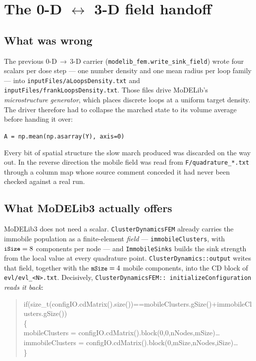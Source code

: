 \documentclass[11pt,a4paper]{article}
\newcommand{\code}[1]{\texttt{\small #1}}
\begin{document}
\section{The 0-D $\leftrightarrow$ 3-D field handoff}
\label{sec:fieldhandoff}

\subsection{What was wrong}

The previous 0-D\,$\to$\,3-D carrier
(\code{modelib\_fem.write\_sink\_field}) wrote four scalars per dose step --- one
number density and one mean radius per loop family --- into
\code{inputFiles/aLoopsDensity.txt} and \code{inputFiles/frankLoopsDensity.txt}.
Those files drive MoDELib's \emph{microstructure generator}, which places
discrete loops at a uniform target density. The driver therefore had to collapse
the marched state to its volume average before handing it over:
\begin{center}
\code{A = np.mean(np.asarray(Y), axis=0)}
\end{center}
Every bit of spatial structure the slow march produced was discarded on the way
out. In the reverse direction the mobile field was read from
\code{F/quadrature\_*.txt} through a column map whose source comment conceded it
had never been checked against a real run.

\subsection{What MoDELib3 actually offers}

MoDELib3 does not need a scalar. \code{ClusterDynamicsFEM} already carries the
immobile population as a finite-element \emph{field} --- \code{immobileClusters},
with $\code{iSize}=8$ components per node --- and \code{ImmobileSinks} builds the
sink strength from the local value at every quadrature point.
\code{ClusterDynamics::output} writes that field, together with the
$\code{mSize}=4$ mobile components, into the CD block of
\code{evl/evl\_<N>.txt}. Decisively, \code{ClusterDynamicsFEM::\allowbreak
initializeConfiguration} \emph{reads it back}:

\begin{quote}\small\ttfamily
if(size\_t(configIO.cdMatrix().size())==mobileClusters.gSize()+immobileClusters.gSize())\\
\{\\
\hspace*{1em}mobileClusters   = configIO.cdMatrix().block(0,0,nNodes,mSize)\ldots\\
\hspace*{1em}immobileClusters = configIO.cdMatrix().block(0,mSize,nNodes,iSize)\ldots\\
\}
\end{quote}
\end{document}
